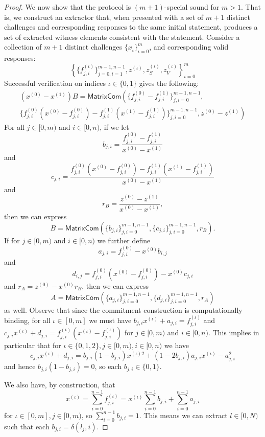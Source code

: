\documentclass{llncs}
\newcommand{\func}[1]{\mathsf{#1}}
\begin{document}
\begin{proof}
    We now show that the protocol is $(m+1)$-special sound for $m > 1$.
    That is, we construct an extractor that, when presented with a set of $m+1$ distinct challenges and corresponding responses to the same initial statement, produces a set of extracted witness elements consistent with the statement.
    Consider a collection of $m+1$ distinct challenges $\{x_\iota\}_{\iota=0}^m$, and corresponding valid responses:
    $$\left\{ \{f_{j,i}^{(\iota)}\}_{j=0,i=1}^{m-1,n-1}, z^{(\iota)}, z_S^{(\iota)}, z_V^{(\iota)} \right\}_{\iota=0}^m$$
    Successful verification on indices $\iota \in \{0,1\}$ gives the following:
    \begin{multline*}
        (x^{(0)} - x^{(1)})B = \func{MatrixCom}\left( \{f_{j,i}^{(0)} - f_{j,i}^{(1)}\}_{j,i=0}^{m-1,n-1}, \right. \\
        \left. \{f_{j,i}^{(0)}(x^{(0)} - f_{j,i}^{(0)}) - f_{j,i}^{(1)}(x^{(1)} - f_{j,i}^{(1)})\}_{j,i=0}^{m-1,n-1}, z^{(0)} - z^{(1)} \right)
    \end{multline*}
    For all $j \in [0,m)$ and $i \in [0,n)$, if we let
    $$b_{j,i} = \frac{f_{j,i}^{(0)} - f_{j,i}^{(1)}}{x^{(0)} - x^{(1)}}$$
    and
    $$c_{j,i} = \frac{f_{j,i}^{(0)}(x^{(0)} - f_{j,i}^{(0)}) - f_{j,i}^{(1)}(x^{(1)} - f_{j,i}^{(1)})}{x^{(0)} - x^{(1)}}$$
    and
    $$r_B = \frac{z^{(0)} - z^{(1)}}{x^{(0)} - x^{(1)}},$$
    then we can express
    $$B = \func{MatrixCom}\left( \{b_{j,i}\}_{j,i=0}^{m-1,n-1}, \{c_{j,i}\}_{j,i=0}^{m-1,n-1}, r_B \right).$$
    If for $j \in [0,m)$ and $i \in [0,n)$ we further define
    $$a_{j,i} = f_{j,i}^{(0)} - x^{(0)}b_{i,j}$$
    and
    $$d_{i,j} = f_{j,i}^{(0)}(x^{(0)} - f_{j,i}^{(0)}) - x^{(0)}c_{j,i}$$
    and $r_A = z^{(0)} - x^{(0)}r_B$, then we can express
    $$A = \func{MatrixCom}\left( \{a_{j,i}\}_{j,i=0}^{m-1,n-1}, \{d_{j,i}\}_{j,i=0}^{m-1,n-1}, r_A \right)$$
    as well.
    Observe that since the commitment construction is computationally binding, for all $\iota \in [0,m]$ we must have $b_{j,i}x^{(\iota)} + a_{j,i} = f_{j,i}^{(\iota)}$ and $c_{j,i}x^{(\iota)} + d_{j,i} = f_{j,i}^{(\iota)}(x^{(\iota)} - f_{j,i}^{(\iota)})$ for $j \in [0,m)$ and $i \in [0,n)$.
    This implies in particular that for $\iota \in \{0,1,2\}, j \in [0,m), i \in [0,n)$ we have
    $$c_{j,i}x^{(\iota)} + d_{j,i} = b_{j,i}(1 - b_{j,i})x^{(\iota) 2} + (1 - 2b_{j,i})a_{j,i}x^{(\iota)} - a_{j,i}^2$$
    and hence $b_{j,i}(1 - b_{j,i}) = 0$, so each $b_{j,i} \in \{0,1\}$.

    We also have, by construction, that
    $$x^{(\iota)} = \sum_{i=0}^{n-1} f_{j,i}^{(\iota)} = x^{(\iota)} \sum_{i=0}^{n-1} b_{j,i} + \sum_{i=0}^{n-1} a_{j,i}$$
    for $\iota \in [0,m], j \in [0,m)$, so $\sum_{i=0}^{n-1} b_{j,i} = 1$.
    This means we can extract $l \in [0,N)$ such that each $b_{j,i} = \delta(l_j,i)$.


\end{proof}
\end{document}
